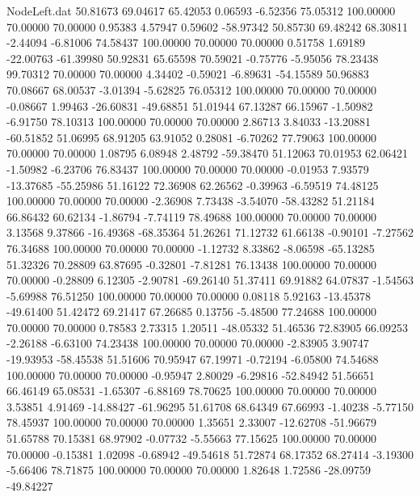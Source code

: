 \begin{filecontents}{NodeLeft.dat}
  50.81673   69.04617   65.42053     0.06593   -6.52356   75.05312  100.00000   70.00000   70.00000    0.95383    4.57947    0.59602  -58.97342
  50.85730   69.48242   68.30811    -2.44094   -6.81006   74.58437  100.00000   70.00000   70.00000    0.51758    1.69189  -22.00763  -61.39980
  50.92831   65.65598   70.59021    -0.75776   -5.95056   78.23438   99.70312   70.00000   70.00000    4.34402   -0.59021   -6.89631  -54.15589
  50.96883   70.08667   68.00537    -3.01394   -5.62825   76.05312  100.00000   70.00000   70.00000   -0.08667    1.99463  -26.60831  -49.68851
  51.01944   67.13287   66.15967    -1.50982   -6.91750   78.10313  100.00000   70.00000   70.00000    2.86713    3.84033  -13.20881  -60.51852
  51.06995   68.91205   63.91052     0.28081   -6.70262   77.79063  100.00000   70.00000   70.00000    1.08795    6.08948    2.48792  -59.38470
  51.12063   70.01953   62.06421    -1.50982   -6.23706   76.83437  100.00000   70.00000   70.00000   -0.01953    7.93579  -13.37685  -55.25986
  51.16122   72.36908   62.26562    -0.39963   -6.59519   74.48125  100.00000   70.00000   70.00000   -2.36908    7.73438   -3.54070  -58.43282
  51.21184   66.86432   60.62134    -1.86794   -7.74119   78.49688  100.00000   70.00000   70.00000    3.13568    9.37866  -16.49368  -68.35364
  51.26261   71.12732   61.66138    -0.90101   -7.27562   76.34688  100.00000   70.00000   70.00000   -1.12732    8.33862   -8.06598  -65.13285
  51.32326   70.28809   63.87695    -0.32801   -7.81281   76.13438  100.00000   70.00000   70.00000   -0.28809    6.12305   -2.90781  -69.26140
  51.37411   69.91882   64.07837    -1.54563   -5.69988   76.51250  100.00000   70.00000   70.00000    0.08118    5.92163  -13.45378  -49.61400
  51.42472   69.21417   67.26685     0.13756   -5.48500   77.24688  100.00000   70.00000   70.00000    0.78583    2.73315    1.20511  -48.05332
  51.46536   72.83905   66.09253    -2.26188   -6.63100   74.23438  100.00000   70.00000   70.00000   -2.83905    3.90747  -19.93953  -58.45538
  51.51606   70.95947   67.19971    -0.72194   -6.05800   74.54688  100.00000   70.00000   70.00000   -0.95947    2.80029   -6.29816  -52.84942
  51.56651   66.46149   65.08531    -1.65307   -6.88169   78.70625  100.00000   70.00000   70.00000    3.53851    4.91469  -14.88427  -61.96295
  51.61708   68.64349   67.66993    -1.40238   -5.77150   78.45937  100.00000   70.00000   70.00000    1.35651    2.33007  -12.62708  -51.96679
  51.65788   70.15381   68.97902    -0.07732   -5.55663   77.15625  100.00000   70.00000   70.00000   -0.15381    1.02098   -0.68942  -49.54618
  51.72874   68.17352   68.27414    -3.19300   -5.66406   78.71875  100.00000   70.00000   70.00000    1.82648    1.72586  -28.09759  -49.84227

\end{filecontents}
